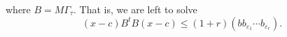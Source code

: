where $B = M\Gamma_\tau$. That is, we are left to solve
\[(x-c)B^tB(x-c) \leq (1 + r)(bb_{\varepsilon_1}\cdots b_{\varepsilon_r}).\]



